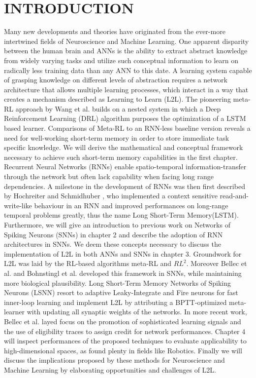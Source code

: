 \documentclass[letterpaper, 10 pt, conference]{ieeeconf}  %
\begin{document}
\section{INTRODUCTION}
Many new developments and theories have originated from the ever-more intertwined fields of Neuroscience and Machine Learning. One apparent 
disparity between the human brain and ANNs is the ability to extract abstract knowledge from widely varying tasks and utilize 
such conceptual information to learn on radically less training data than any ANN to this date. A learning system capable of 
grasping knowledge on different levels of abstraction requires
a network architecture that allows multiple learning processes, which interact in a way that creates a mechanism described as Learning
to Learn (L2L). The pioneering meta-RL approach by Wang et al. \cite{wangLearningReinforcementLearn2016} builds on a nested system in which
a Deep Reinforcement Learning (DRL) algorithm purposes the optimization of a LSTM based learner. Comparisons of Meta-RL to an 
RNN-less baseline version reveals a need for well-working short-term memory in order to store immediate task specific knowledge.
We will derive the mathematical and conceptual framework necessary to achieve such short-term memory capabilities in the first chapter. Recurrent 
Neural Networks (RNNs) enable spatio-temporal information-transfer through the network but often lack capability when facing long range
dependencies. A milestone in the development of RNNs was then first described by Hochreiter and Schmidhuber \cite{hochreiterLongShortTermMemory1997},
who implemented a context sensitive read-and-write-like behaviour in an RNN and improved performances on long-range temporal problems greatly, thus 
the name Long Short-Term Memory(LSTM). Furthermore, we will give an introduction to previous work on Networks of Spiking Neurons (SNNs) 
in chapter 2 and describe the adoption of RNN architectures in SNNs. We deem these 
concepts necessary to discuss the implementation of L2L in both ANNs and SNNs in chapter 3. Groundwork for L2L was laid by the RL-based algorithms
meta-RL\cite{wangLearningReinforcementLearn2016} and $RL^2$\cite{duanRLFastReinforcement2016}. Moreover Bellec et al. \cite{bellecLongShorttermMemory2018}
\cite{bellecBiologicallyInspiredAlternatives} and Bohnstingl et al. developed this framework in SNNs, while maintaining more biological plausibility. 
Long Short-Term Memory Networks of Spiking Neurons (LSNN) resort to adaptive Leaky-Integrate and Fire neurons for fast
inner-loop learning and implement L2L by attributing a BPTT-optimized meta-learner with updating all synaptic weights of the networks. 
In more recent work, Bellec et al. layed focus on the promotion of sophisticated learning signals and the use of eligibility traces to assign 
credit for network performances. Chapter 4 will inspect performances of the proposed techniques to evaluate applicability to high-dimensional 
spaces, as found plenty in fields like Robotics. Finally we will discuss the implications proposed by these methods for Neuroscience and
Machine Learning by elaborating opportunities and challenges of L2L.
\end{document}
